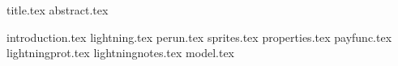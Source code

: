 \documentclass[11pt]{llncs}
\begin{document}
{title.tex}
\thispagestyle{plain}
{abstract.tex}

{introduction.tex}
{lightning.tex}
{perun.tex}
{sprites.tex}
{properties.tex}
{payfunc.tex}
{lightningprot.tex}
{lightningnotes.tex}
{model.tex}

\end{document}
